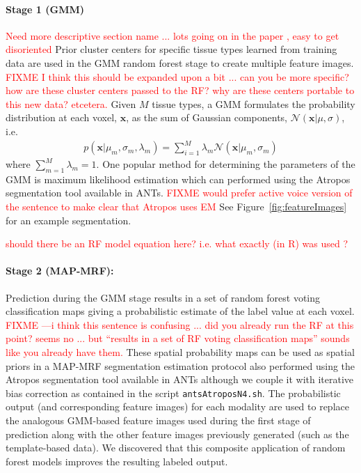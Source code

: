 \documentclass[final,5p,times,twocolumn]{elsarticle}
\begin{document}
\paragraph{Stage 1 (GMM)} \textcolor{red}{Need more descriptive
  section name ... lots going on in the paper , easy to get disoriented}
Prior cluster centers for specific tissue types learned from training data \citep{reynolds2009} are used in the GMM random forest stage to create 
multiple feature images.  \textcolor{red}{FIXME I think this should be
  expanded upon a bit ... can you be more specific?  how are these
  cluster centers passed to the RF?  why are these centers portable to
  this new data? etcetera.}
Given $M$ tissue types, a GMM formulates the 
probability distribution at each voxel, $\mathbf{x}$, as the
sum of Gaussian components, $\mathcal{N}(\mathbf{x}|\mu,\sigma)$, i.e.
\begin{align}
p\left(\mathbf{x}|\mu_m,\sigma_m,\lambda_m\right) = \sum_{i=1}^M \lambda_m \mathcal{N}(\mathbf{x}|\mu_m,\sigma_m)
\end{align}
where $\sum_{m=1}^M \lambda_m = 1$.  One popular method for 
determining the parameters of the GMM is maximum likelihood 
estimation which can performed using the Atropos segmentation 
tool \citep{avants2011} available in ANTs.  \textcolor{red}{FIXME
  would prefer active voice version of the sentence to make clear that
  Atropos uses EM} See Figure~\ref{fig:featureImages} for
an example segmentation.  


\textcolor{red}{should there be an RF model equation here?  i.e. what
  exactly (in R) was used ?}

\paragraph{Stage 2 (MAP-MRF):}

Prediction during the GMM stage results in a set of random 
forest voting classification maps giving a probabilistic estimate
of the label value at each voxel.  \textcolor{red}{FIXME ---i think
  this sentence is confusing ... did you already run the RF at this
  point?  seems no ... but ``results in a set of RF voting
  classification maps'' sounds like you already have them.}  These spatial probability
maps can be used as spatial priors in a MAP-MRF segmentation
estimation protocol also performed using the Atropos segmentation 
tool \citep{avants2011} available in ANTs although we couple
it with iterative bias correction as contained in the script
{\tt antsAtroposN4.sh}.  The probabilistic output (and corresponding
feature images) 
for each modality are used to replace the analogous GMM-based feature images used 
during the first stage of prediction along with the other feature
images previously generated (such as the template-based data).
We discovered that this composite application of random
forest models improves the resulting labeled output.
\end{document}
